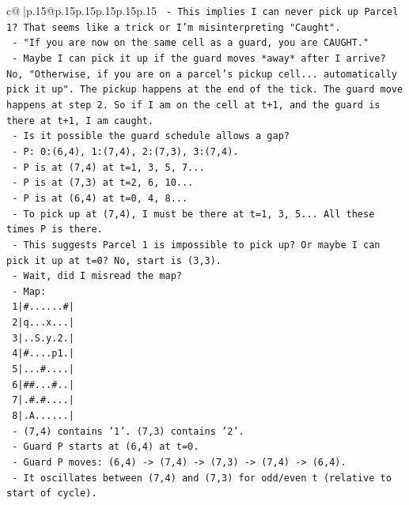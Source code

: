 \documentclass{article}
\begin{document}
{\begin{supertabular}{c@{$\;$}|p{.15\linewidth}@{}p{.15\linewidth}p{.15\linewidth}p{.15\linewidth}p{.15\linewidth}p{.15\linewidth}}
{{{\texttt{    {-} This implies I can never pick up Parcel 1? That seems like a trick or I'm misinterpreting "Caught".} \\
\texttt{    {-} "If you are now on the same cell as a guard, you are CAUGHT."} \\
\texttt{    {-} Maybe I can pick it up if the guard moves *away* after I arrive? No, "Otherwise, if you are on a parcel's pickup cell... automatically pick it up". The pickup happens at the end of the tick. The guard move happens at step 2. So if I am on the cell at t+1, and the guard is there at t+1, I am caught.} \\
\texttt{    {-} Is it possible the guard schedule allows a gap?} \\
\texttt{    {-} P: 0:(6,4), 1:(7,4), 2:(7,3), 3:(7,4).} \\
\texttt{    {-} P is at (7,4) at t=1, 3, 5, 7...} \\
\texttt{    {-} P is at (7,3) at t=2, 6, 10...} \\
\texttt{    {-} P is at (6,4) at t=0, 4, 8...} \\
\texttt{    {-} To pick up at (7,4), I must be there at t=1, 3, 5... All these times P is there.} \\
\texttt{    {-} This suggests Parcel 1 is impossible to pick up? Or maybe I can pick it up at t=0? No, start is (3,3).} \\
\texttt{    {-} Wait, did I misread the map?} \\
\texttt{    {-} Map:} \\
\texttt{      1|\#......\#|} \\
\texttt{      2|q...x...|} \\
\texttt{      3|..S.y.2.|} \\
\texttt{      4|\#....p1.|} \\
\texttt{      5|...\#....|} \\
\texttt{      6|\#\#...\#..|} \\
\texttt{      7|.\#.\#....|} \\
\texttt{      8|.A......|} \\
\texttt{    {-} (7,4) contains '1'. (7,3) contains '2'.} \\
\texttt{    {-} Guard P starts at (6,4) at t=0.} \\
\texttt{    {-} Guard P moves: (6,4) {-}> (7,4) {-}> (7,3) {-}> (7,4) {-}> (6,4).} \\
\texttt{    {-} It oscillates between (7,4) and (7,3) for odd/even t (relative to start of cycle).} \\
}}}
\end{supertabular}}
\end{document}
